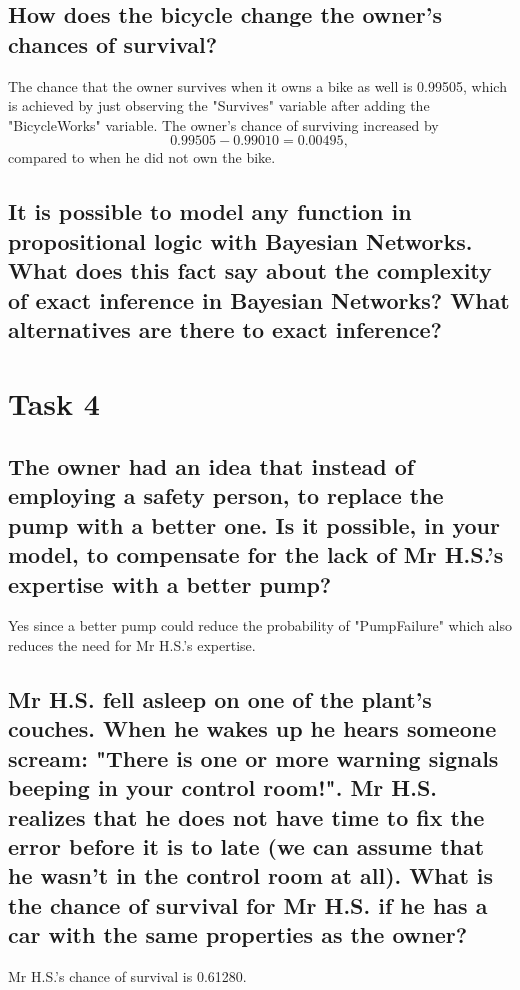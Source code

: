 \documentclass[a4paper,10pt]{article}
\begin{document}
 \subsection{How does the bicycle change the owner's chances of survival?}

 The chance that the owner survives when it owns a bike as well is 0.99505, which is achieved by just observing the "Survives" variable after adding the
 "BicycleWorks" variable.
 The owner's chance of surviving increased by 
 \begin{equation*}
	0.99505 - 0.99010 = 0.00495,
 \end{equation*} compared to when he did not own the bike.

 \subsection{It is possible to model any function in propositional logic with Bayesian Networks. 
 What does this fact say about the complexity of exact inference in Bayesian Networks? 
 What alternatives are there to exact inference?}

 \section{Task 4}

 \subsection{The owner had an idea that instead of employing a safety person, to replace the pump with a better one. 
 Is it possible, in your model, to compensate for the lack of Mr H.S.'s expertise with a better pump?}

 Yes since a better pump could reduce the probability of "PumpFailure" which also reduces the need for Mr H.S.'s expertise. 

 \subsection{Mr H.S. fell asleep on one of the plant's couches. 
 When he wakes up he hears someone scream: "There is one or more warning signals beeping in your control room!". 
 Mr H.S. realizes that he does not have time to fix the error before it is to late (we can assume that he wasn't in the control room at all). 
 What is the chance of survival for Mr H.S. if he has a car with the same properties as the owner?}

 Mr H.S.'s chance of survival is 0.61280.
\end{document}
